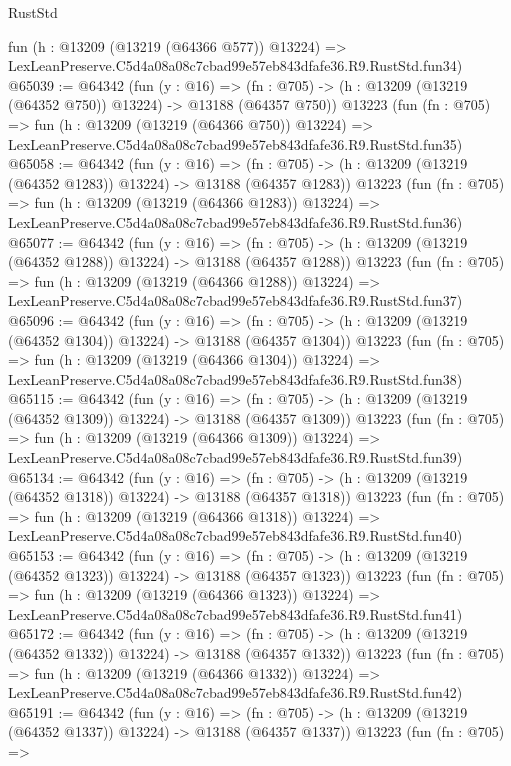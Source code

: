 \begin{lexlean}{RustStd}
\begin{coremodule}
    fun (h : @13209 (@13219 (@64366 @577)) @13224) =>
    LexLeanPreserve.C5d4a08a08c7cbad99e57eb843dfafe36.R9.RustStd.fun34)
@65039 := @64342
    (fun (y : @16) =>
    (fn : @705) -> (h : @13209 (@13219 (@64352 @750)) @13224) -> @13188 (@64357 @750))
    @13223
    (fun (fn : @705) =>
    fun (h : @13209 (@13219 (@64366 @750)) @13224) =>
    LexLeanPreserve.C5d4a08a08c7cbad99e57eb843dfafe36.R9.RustStd.fun35)
@65058 := @64342
    (fun (y : @16) =>
    (fn : @705) -> (h : @13209 (@13219 (@64352 @1283)) @13224) -> @13188 (@64357 @1283))
    @13223
    (fun (fn : @705) =>
    fun (h : @13209 (@13219 (@64366 @1283)) @13224) =>
    LexLeanPreserve.C5d4a08a08c7cbad99e57eb843dfafe36.R9.RustStd.fun36)
@65077 := @64342
    (fun (y : @16) =>
    (fn : @705) -> (h : @13209 (@13219 (@64352 @1288)) @13224) -> @13188 (@64357 @1288))
    @13223
    (fun (fn : @705) =>
    fun (h : @13209 (@13219 (@64366 @1288)) @13224) =>
    LexLeanPreserve.C5d4a08a08c7cbad99e57eb843dfafe36.R9.RustStd.fun37)
@65096 := @64342
    (fun (y : @16) =>
    (fn : @705) -> (h : @13209 (@13219 (@64352 @1304)) @13224) -> @13188 (@64357 @1304))
    @13223
    (fun (fn : @705) =>
    fun (h : @13209 (@13219 (@64366 @1304)) @13224) =>
    LexLeanPreserve.C5d4a08a08c7cbad99e57eb843dfafe36.R9.RustStd.fun38)
@65115 := @64342
    (fun (y : @16) =>
    (fn : @705) -> (h : @13209 (@13219 (@64352 @1309)) @13224) -> @13188 (@64357 @1309))
    @13223
    (fun (fn : @705) =>
    fun (h : @13209 (@13219 (@64366 @1309)) @13224) =>
    LexLeanPreserve.C5d4a08a08c7cbad99e57eb843dfafe36.R9.RustStd.fun39)
@65134 := @64342
    (fun (y : @16) =>
    (fn : @705) -> (h : @13209 (@13219 (@64352 @1318)) @13224) -> @13188 (@64357 @1318))
    @13223
    (fun (fn : @705) =>
    fun (h : @13209 (@13219 (@64366 @1318)) @13224) =>
    LexLeanPreserve.C5d4a08a08c7cbad99e57eb843dfafe36.R9.RustStd.fun40)
@65153 := @64342
    (fun (y : @16) =>
    (fn : @705) -> (h : @13209 (@13219 (@64352 @1323)) @13224) -> @13188 (@64357 @1323))
    @13223
    (fun (fn : @705) =>
    fun (h : @13209 (@13219 (@64366 @1323)) @13224) =>
    LexLeanPreserve.C5d4a08a08c7cbad99e57eb843dfafe36.R9.RustStd.fun41)
@65172 := @64342
    (fun (y : @16) =>
    (fn : @705) -> (h : @13209 (@13219 (@64352 @1332)) @13224) -> @13188 (@64357 @1332))
    @13223
    (fun (fn : @705) =>
    fun (h : @13209 (@13219 (@64366 @1332)) @13224) =>
    LexLeanPreserve.C5d4a08a08c7cbad99e57eb843dfafe36.R9.RustStd.fun42)
@65191 := @64342
    (fun (y : @16) =>
    (fn : @705) -> (h : @13209 (@13219 (@64352 @1337)) @13224) -> @13188 (@64357 @1337))
    @13223
    (fun (fn : @705) =>

\end{coremodule}
\end{lexlean}
